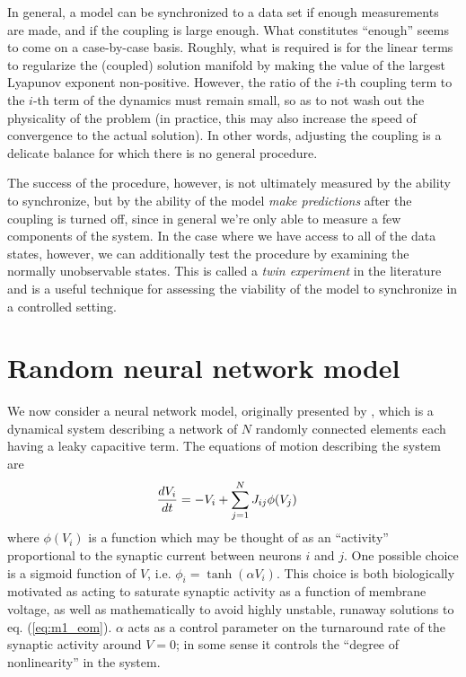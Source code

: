 \documentclass{article} %
\begin{document}
In general, a model can be synchronized to a data set if enough measurements are made, and if the coupling is large enough.  What constitutes ``enough'' seems to come on a case-by-case basis.  Roughly, what is required is for the linear terms to regularize the (coupled) solution manifold by making the value of the largest Lyapunov exponent non-positive.  However, the ratio of the $i$-th coupling term to the $i$-th term of the dynamics must remain small, so as to not wash out the physicality of the problem (in practice, this may also increase the speed of convergence to the actual solution).  In other words, adjusting the coupling is a delicate balance for which there is no general procedure.

The success of the procedure, however, is not ultimately measured by the ability to synchronize, but by the ability of the model \emph{make predictions} after the coupling is turned off, since in general we're only able to measure a few components of the system.  In the case where we have access to all of the data states, however, we can additionally test the procedure by examining the normally unobservable states.  This is called a \emph{twin experiment} in the literature and is a useful technique for assessing the viability of the model to synchronize in a controlled setting.

\section{Random neural network model}
We now consider a neural network model, originally presented by \cite{Sompolinsky1988}, which is a dynamical system describing a network of $N$ randomly connected elements each having a leaky capacitive term.  The equations of motion describing the system are
\begin{align}
	\frac{d V_i}{d t} &= -V_i + \sum_{j=1}^{N} J_{ij} \phi(V_j) \label{eq:m1_eom}
\end{align}
where $\phi(V_i)$ is a function which may be thought of as an ``activity'' proportional to the synaptic current between neurons $i$ and $j$.  One possible choice is a sigmoid function of $V$, i.e. $\phi_i = \tanh\left(\alpha V_i\right)$.  This choice is both biologically motivated as acting to saturate synaptic activity as a function of membrane voltage, as well as mathematically to avoid highly unstable, runaway solutions to eq. (\ref{eq:m1_eom}).  $\alpha$ acts as a control parameter on the turnaround rate of the synaptic activity around $V = 0$; in some sense it controls the ``degree of nonlinearity'' in the system.
\end{document}
